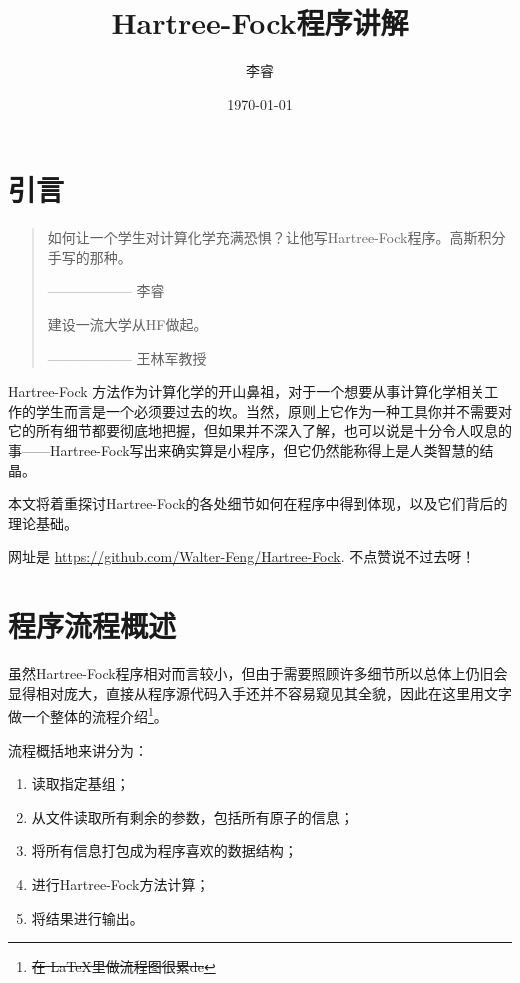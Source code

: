 \documentclass[12pt,a4paper,openany,twoside]{article}
\title{Hartree-Fock程序讲解}
\author{李睿}
\date{\today}
\numberwithin{equation}{section}
\begin{document}
        \maketitle
        \tableofcontents

        \newpage

        \section{引言}
            \begin{quote}
                如何让一个学生对计算化学充满恐惧？让他写Hartree-Fock程序。高斯积分手写的那种。
                \begin{flushright}
                    —————— 李睿
                \end{flushright}

                建设一流大学从HF做起。
                
                \begin{flushright}
                    —————— 王林军教授
                \end{flushright}
            \end{quote}

            Hartree-Fock 方法作为计算化学的开山鼻祖，对于一个想要从事计算化学相关工作的学生而言是一个必须要过去的坎。当然，原则上它作为一种工具你并不需要对它的所有细节都要彻底地把握，但如果并不深入了解，也可以说是十分令人叹息的事——Hartree-Fock写出来确实算是小程序，但它仍然能称得上是人类智慧的结晶。

            本文将着重探讨Hartree-Fock的各处细节如何在程序中得到体现，以及它们背后的理论基础。

            网址是 \url{https://github.com/Walter-Feng/Hartree-Fock}. 不点赞说不过去呀！

        \section{程序流程概述}

            虽然Hartree-Fock程序相对而言较小，但由于需要照顾许多细节所以总体上仍旧会显得相对庞大，直接从程序源代码入手还并不容易窥见其全貌，因此在这里用文字做一个整体的流程介绍\footnote{\sout{在 \LaTeX 里做流程图很累de}}。

            流程概括地来讲分为：
            \begin{enumerate}
                \item 读取指定基组；
                \item 从文件读取所有剩余的参数，包括所有原子的信息；
                \item 将所有信息打包成为程序喜欢的数据结构；
                \item 进行Hartree-Fock方法计算；
                \item 将结果进行输出。
            \end{enumerate}
\end{document}
